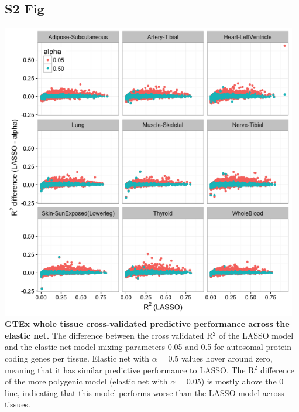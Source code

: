 \documentclass[10pt,letterpaper]{article}
\begin{document}
\begin{singlespace}
\subsection*{S2 Fig}
\includegraphics[width=13cm]{Figures/GenArch_Supp/S2Fig.png}
\label{S2_Fig}
{\bf GTEx whole tissue cross-validated predictive performance across the elastic net.} The difference between the cross validated R$^2$ of the LASSO model and the elastic net model mixing parameters 0.05 and 0.5 for autosomal protein coding genes per tissue. Elastic net with $\alpha=0.5$ values hover around zero, meaning that it has similar predictive performance to LASSO. The R$^2$ difference of the more polygenic model (elastic net with $\alpha=0.05$) is mostly above the 0 line, indicating that this model performs worse than the LASSO model across tissues.


\end{singlespace}
\end{document}
